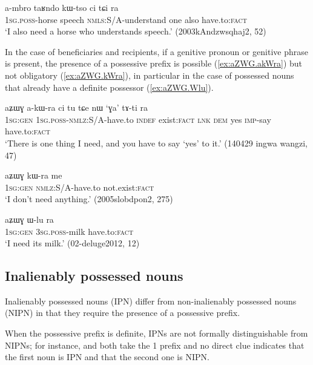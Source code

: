  \begin{exe}
\ex \label{ex:ambro.tARndo.kWtso}
\gll a-mbro taʁndo kɯ-tso ci tɕi ra \\
\textsc{1sg.poss}-horse speech \textsc{nmls}:S/A-understand one also have.to:\textsc{fact} \\
\glt `I also need a horse who understands speech.' (2003kAndzwsqhaj2, 52)
\end{exe}
In the case of beneficiaries and recipients, if a genitive pronoun or genitive phrase is present, the presence of a possessive prefix is possible (\ref{ex:aZWG.akWra}) but not obligatory (\ref{ex:aZWG.kWra}), in particular in the case of possessed nouns that already have a definite possessor (\ref{ex:aZWG.Wlu}).

 \begin{exe}
\ex \label{ex:aZWG.akWra}
\gll aʑɯɣ a-kɯ-ra ci tu tɕe nɯ `ɣa' tɤ-ti ra \\
\textsc{1sg:gen} \textsc{1sg.poss}-\textsc{nmlz}:S/A-have.to \textsc{indef} exist:\textsc{fact} \textsc{lnk} \textsc{dem} yes \textsc{imp}-say have.to:\textsc{fact} \\
\glt `There is one thing I need, and you have to say `yes' to it.' (140429 ingwa wangzi, 47)
\end{exe}

 \begin{exe}
\ex \label{ex:aZWG.kWra}
\gll  aʑɯɣ kɯ-ra me \\
\textsc{1sg:gen} \textsc{nmlz}:S/A-have.to not.exist:\textsc{fact} \\
\glt `I don't need anything.' (2005slobdpon2, 275)
\end{exe}

 \begin{exe}
\ex \label{ex:aZWG.Wlu}
\gll aʑɯɣ ɯ-lu ra \\
\textsc{1sg:gen} \textsc{3sg.poss}-milk have.to:\textsc{fact} \\
\glt `I need its milk.' (02-deluge2012, 12)
\end{exe}

\subsection{Inalienably possessed nouns} \label{sec:inalienably.possessed}
Inalienably possessed nouns (IPN) differ from non-inalienably possessed nouns (NIPN) in that they require the presence of a possessive prefix. 

When the possessive prefix is definite, IPNs are not formally distinguishable from NIPNs; for instance,  and  both take the 1\sg{}  prefix and no direct clue indicates that the first noun is IPN and that the second one is NIPN.

